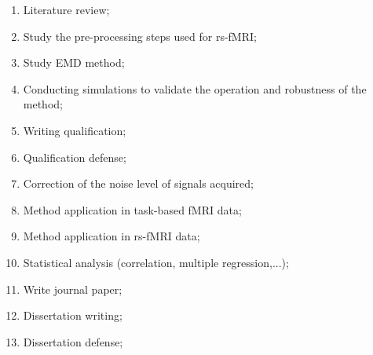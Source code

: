 \documentclass[11pt]{article}
\begin{document}
\begin{enumerate}
 \item Literature review;
 \item Study the pre-processing steps used for rs-fMRI;
 \item Study EMD method;
 \item Conducting simulations to validate the operation and robustness of the method;
 \item Writing qualification;
 \item Qualification defense;
 \item Correction of the noise level of signals acquired;
 \item Method application in task-based fMRI data;
 \item Method application in rs-fMRI data;
 \item Statistical analysis (correlation, multiple regression,...);
 \item Write journal paper;
 \item Dissertation writing;
 \item Dissertation defense;
\end{enumerate}

\end{document}
